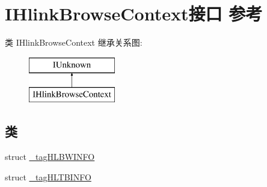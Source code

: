 \hypertarget{interface_i_hlink_browse_context}{}\section{I\+Hlink\+Browse\+Context接口 参考}
\label{interface_i_hlink_browse_context}
类 I\+Hlink\+Browse\+Context 继承关系图\+:\begin{figure}[H]
\begin{center}
\leavevmode
\includegraphics[height=2.000000cm]{interface_i_hlink_browse_context}
\end{center}
\end{figure}
\subsection*{类}
\begin{DoxyCompactItemize}
\item 
struct \hyperlink{struct_i_hlink_browse_context_1_1__tag_h_l_b_w_i_n_f_o}{\+\_\+tag\+H\+L\+B\+W\+I\+N\+FO}
\item 
struct \hyperlink{struct_i_hlink_browse_context_1_1__tag_h_l_t_b_i_n_f_o}{\+\_\+tag\+H\+L\+T\+B\+I\+N\+FO}
\end{DoxyCompactItemize}
